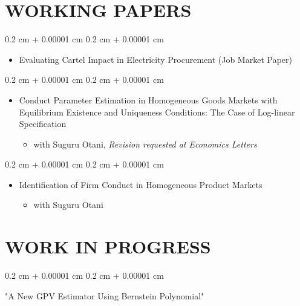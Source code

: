 \documentclass[10pt, letterpaper]{article}
\newenvironment{highlights}{
    \begin{itemize}[
        topsep=0.10 cm,
        parsep=0.10 cm,
        partopsep=0pt,
        itemsep=0.0 cm,
        leftmargin=0.4 cm + 10pt
    ]
}{
    \end{itemize}
} %
\newenvironment{onecolentry}{
    \begin{adjustwidth}{
        0.2 cm + 0.00001 cm
    }{
        0.2 cm + 0.00001 cm
    }
}{
    \end{adjustwidth}
} %
\begin{document}
    \section{WORKING PAPERS}
    \begin{samepage}
        \begin{onecolentry}
            \begin{highlights}
                \item Evaluating Cartel Impact in Electricity Procurement (Job Market Paper)
            \end{highlights}
        \end{onecolentry}
    \end{samepage}
    \vspace{0.10 cm}
    \begin{samepage}
        \begin{onecolentry}
            \begin{highlights}
                \item Conduct Parameter Estimation in Homogeneous Goods Markets with Equilibrium Existence and Uniqueness Conditions: The Case of Log-linear Specification
                \begin{highlights}
                    \item with Suguru Otani, \textit{Revision requested at Economics Letters}
                \end{highlights}
            \end{highlights}
        \end{onecolentry}
        \begin{onecolentry}
            \begin{highlights}
                \item Identification of Firm Conduct in Homogeneous Product Markets
                \begin{highlights}
                    \item with Suguru Otani
                \end{highlights}
            \end{highlights}
        \end{onecolentry}
    \end{samepage}

    \section{WORK IN PROGRESS}
    \begin{onecolentry}
        "A New GPV Estimator Using Bernstein Polynomial"
    \end{onecolentry}
\end{document}
